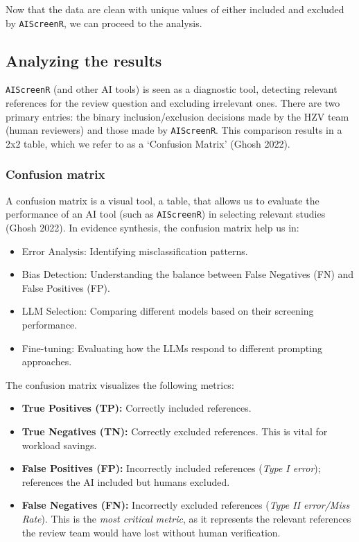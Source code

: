 \documentclass[
  letterpaper,
  DIV=11,
  numbers=noendperiod]{scrartcl}
\begin{document}
Now that the data are clean with unique values of either included and
excluded by \texttt{AIScreenR}, we can proceed to the analysis.

\subsection{Analyzing the results}\label{analyzing-the-results}

\texttt{AIScreenR} (and other AI tools) is seen as a diagnostic tool,
detecting relevant references for the review question and excluding
irrelevant ones. There are two primary entries: the binary
inclusion/exclusion decisions made by the HZV team (human reviewers) and
those made by \texttt{AIScreenR}. This comparison results in a 2x2
table, which we refer to as a `Confusion Matrix' (Ghosh 2022).

\subsubsection{Confusion matrix}\label{confusion-matrix}

A confusion matrix is a visual tool, a table, that allows us to evaluate
the performance of an AI tool (such as \texttt{AIScreenR}) in selecting
relevant studies (Ghosh 2022). In evidence synthesis, the confusion
matrix help us in:

\begin{itemize}
\item
  Error Analysis: Identifying misclassification patterns.
\item
  Bias Detection: Understanding the balance between False Negatives (FN)
  and False Positives (FP).
\item
  LLM Selection: Comparing different models based on their screening
  performance.
\item
  Fine-tuning: Evaluating how the LLMs respond to different prompting
  approaches.
\end{itemize}

The confusion matrix visualizes the following metrics:

\begin{itemize}
\item
  \textbf{True Positives (TP):} Correctly included references.
\item
  \textbf{True Negatives (TN):} Correctly excluded references. This is
  vital for workload savings.
\item
  \textbf{False Positives (FP):} Incorrectly included references
  (\emph{Type I error}); references the AI included but humans excluded.
\item
  \textbf{False Negatives (FN):} Incorrectly excluded references
  (\emph{Type II error/Miss Rate}). This is the \emph{most critical
  metric}, as it represents the relevant references the review team
  would have lost without human verification.
\end{itemize}
\end{document}
